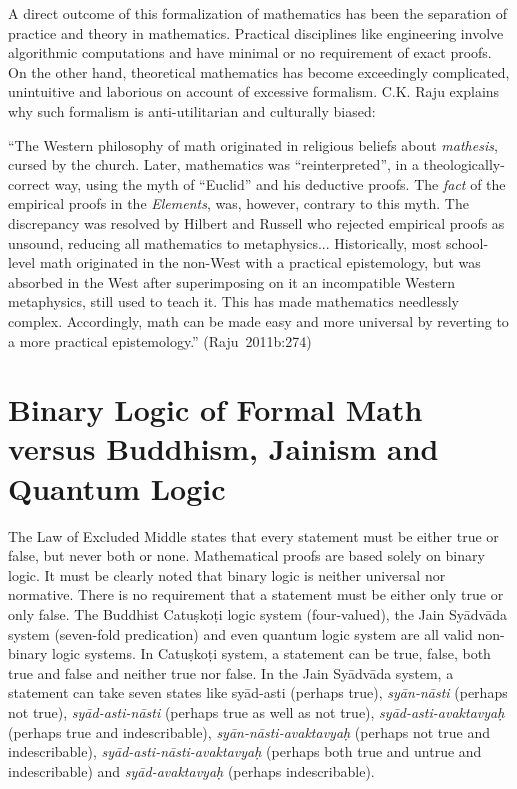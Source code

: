A direct outcome of this formalization of mathematics has been the separation of practice and theory in mathematics. Practical disciplines like engineering involve algorithmic computations and have minimal or no requirement of exact proofs. On the other hand, theoretical mathematics has become exceedingly complicated, unintuitive and laborious on account of excessive formalism. C.K. Raju explains why such formalism is anti-utilitarian and culturally biased: 
\begin{myquote}
``The Western philosophy of math originated in religious beliefs about {\sl mathesis}, cursed by the church. Later, mathematics was ``reinterpreted'', in a theologically-correct way, using the myth of ``Euclid'' and his deductive proofs. The {\sl fact} of the empirical proofs in the {\sl Elements}, was, however, contrary to this myth. The discrepancy was resolved by Hilbert and Russell who rejected empirical proofs as unsound, reducing all mathematics to metaphysics... Historically, most school-level math originated in the non-West with a practical epistemology, but was absorbed in the West after superimposing on it an incompatible Western metaphysics, still used to teach it. This has made mathematics needlessly complex. Accordingly, math can be made easy and more universal by reverting to a more practical epistemology.''
\hfill \hbox{(Raju 2011b:274)}
\end{myquote}

\section*{Binary Logic of Formal Math versus Buddhism, Jainism and Quantum Logic}

The Law of Excluded Middle states that every statement must be either true or false, but never both or none. Mathematical proofs are based solely on binary logic. It must be clearly noted that binary logic is neither universal nor normative. There is no requirement that a statement must be either only true or only false. The Buddhist Catuṣkoṭi  logic system (four-valued), the Jain Syādvāda system (seven-fold predication) and even quantum logic system are all valid non-binary logic systems. In Catuṣkoṭi system, a statement can be true, false, both true and false and neither true nor false. In the Jain Syādvāda system, a statement can take seven states like syād-asti (perhaps true), {\sl syān-nāsti} (perhaps not true), {\sl syād-asti-nāsti} (perhaps true as well as not true), {\sl syād-asti-avaktavyaḥ} (perhaps true and indescribable), {\sl syān-nāsti-avaktavyaḥ} (perhaps not true and indescribable), {\sl syād-asti-nāsti-avaktavyaḥ} (perhaps both true and untrue and indescribable) and {\sl syād-avaktavyaḥ} (perhaps indescribable). 

